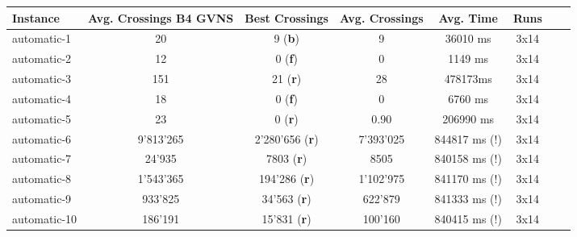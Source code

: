 \documentclass[11pt]{article}
\begin{document}
\begin{tabular}{l*{6}{c}r}
	Instance & Avg. Crossings B4 GVNS & Best Crossings & Avg. Crossings & Avg. Time & Runs\\
	\hline
	automatic-1 & 20 & 9 (\textbf{b}) & 9 & 36010 ms & 3x14 \\
	automatic-2 & 12 & 0 (\textbf{f})& 0 & 1149 ms & 3x14 \\
	automatic-3 & 151 & 21 (\textbf{r})& 28 & 478173ms & 3x14 \\
	automatic-4 & 18 & 0 (\textbf{f})& 0 & 6760 ms & 3x14 \\
	automatic-5 & 23 & 0 (\textbf{r})& 0.90 & 206990 ms & 3x14 \\
	automatic-6 & 9'813'265 &2'280'656 (\textbf{r})& 7'393'025 & 844817 ms (!) & 3x14 \\
	automatic-7 & 24'935 & 7803 (\textbf{r})& 8505 & 840158 ms (!) & 3x14 \\
	automatic-8 & 1'543'365 & 194'286 (\textbf{r})& 1'102'975 & 841170 ms (!) & 3x14 \\
	automatic-9 & 933'825 & 34'563 (\textbf{r})& 622'879 & 841333 ms (!) & 3x14 \\
	automatic-10 & 186'191 &15'831 (\textbf{r})& 100'160 & 840415 ms (!)  & 3x14 \\
\end{tabular}
\end{document}
